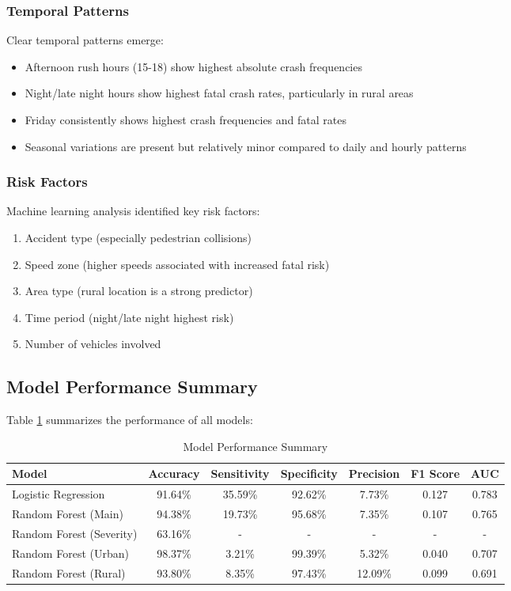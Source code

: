 \documentclass[12pt,a4paper]{article}
\begin{document}
\subsubsection{Temporal Patterns}
Clear temporal patterns emerge:
\begin{itemize}
    \item Afternoon rush hours (15-18) show highest absolute crash frequencies
    \item Night/late night hours show highest fatal crash rates, particularly in rural areas
    \item Friday consistently shows highest crash frequencies and fatal rates
    \item Seasonal variations are present but relatively minor compared to daily and hourly patterns
\end{itemize}

\subsubsection{Risk Factors}
Machine learning analysis identified key risk factors:
\begin{enumerate}
    \item Accident type (especially pedestrian collisions)
    \item Speed zone (higher speeds associated with increased fatal risk)
    \item Area type (rural location is a strong predictor)
    \item Time period (night/late night highest risk)
    \item Number of vehicles involved
\end{enumerate}

\subsection{Model Performance Summary}

Table \ref{tab:model_performance} summarizes the performance of all models:

\begin{table}[htbp]
\centering
\caption{Model Performance Summary}
\label{tab:model_performance}
\begin{tabular}{lcccccc}
\toprule
Model & Accuracy & Sensitivity & Specificity & Precision & F1 Score & AUC \\
\midrule
Logistic Regression & 91.64\% & 35.59\% & 92.62\% & 7.73\% & 0.127 & 0.783 \\
Random Forest (Main) & 94.38\% & 19.73\% & 95.68\% & 7.35\% & 0.107 & 0.765 \\
Random Forest (Severity) & 63.16\% & - & - & - & - & - \\
Random Forest (Urban) & 98.37\% & 3.21\% & 99.39\% & 5.32\% & 0.040 & 0.707 \\
Random Forest (Rural) & 93.80\% & 8.35\% & 97.43\% & 12.09\% & 0.099 & 0.691 \\
\bottomrule
\end{tabular}
\end{table}
\end{document}
